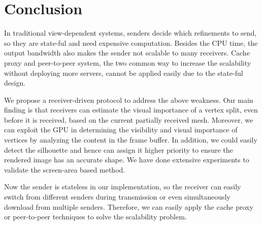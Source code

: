 \section{Conclusion}
\label{s:dstream:conclude}
In traditional view-dependent systems,
senders decide which refinements to send, so they are
state-ful and need expensive computation. %
Besides the CPU time,
the output bandwidth also makes the sender not scalable to many receivers.
Cache proxy and peer-to-peer system, the two common way to increase the scalability
without deploying more servers, cannot be applied easily due to the state-ful design.

We propose a receiver-driven protocol to address the above weakness.
Our main finding is that %
receivers can estimate the visual importance of a vertex split, even before
it is received, based on the current partially received mesh. 
Moreover, we can exploit the GPU
in determining the visibility and visual importance of vertices by
analyzing the content in the frame buffer. 
In addition, we could easily detect the silhouette and hence can 
assign it higher priority to ensure the rendered image has an accurate shape.
We have done extensive experiments to validate the screen-area based method.

Now the sender is stateless in our implementation, so the receiver can easily
switch from different senders during transmission or even simultaneously
download from multiple senders. Therefore, we can easily apply
the cache proxy or peer-to-peer techniques to solve the scalability problem. 

